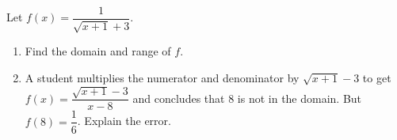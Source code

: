Let $f(x)=\dfrac{1}{\sqrt{x+1}+3}$.
\begin{enumerate}
\item[(a)] Find the domain and range of $f$.
\item[(b)] A student multiplies the numerator and denominator by $\sqrt{x+1}-3$ to get $f(x)=\dfrac{\sqrt{x+1}-3}{x-8}$ and concludes that $8$ is not in the domain. But $f(8)=\dfrac{1}{6}$. Explain the error.
\end{enumerate}
